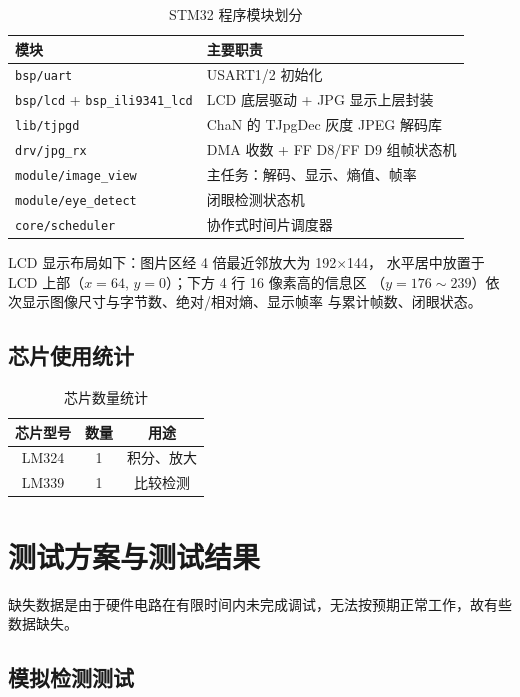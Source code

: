 \documentclass[a4paper]{article}
\begin{document}
\begin{table}[H]
\centering
\caption{STM32 程序模块划分}
\label{tab:mcu_modules}
\begin{tabular}{ll}
\toprule
模块 & 主要职责 \\
\midrule
\texttt{bsp/uart}                    & USART1/2 初始化 \\
\texttt{bsp/lcd} + \texttt{bsp\_ili9341\_lcd} & LCD 底层驱动 + JPG 显示上层封装 \\
\texttt{lib/tjpgd}                   & ChaN 的 TJpgDec 灰度 JPEG 解码库 \\
\texttt{drv/jpg\_rx}                 & DMA 收数 + FF D8/FF D9 组帧状态机 \\
\texttt{module/image\_view}          & 主任务：解码、显示、熵值、帧率 \\
\texttt{module/eye\_detect}          & 闭眼检测状态机 \\
\texttt{core/scheduler}              & 协作式时间片调度器 \\
\bottomrule
\end{tabular}
\end{table}

LCD 显示布局如下：图片区经 4 倍最近邻放大为 192$\times$144，
水平居中放置于 LCD 上部（$x=64$, $y=0$）；下方 4 行 16 像素高的信息区
（$y=176 \sim 239$）依次显示图像尺寸与字节数、绝对/相对熵、显示帧率
与累计帧数、闭眼状态。


\subsection{芯片使用统计}

\begin{table}[H]
\centering
\caption{芯片数量统计}
\begin{tabular}{ccc}
\toprule
芯片型号&数量&用途\\
\midrule
LM324& 1&积分、放大\\
LM339& 1&比较检测\\
\bottomrule
\end{tabular}
\end{table}


\newpage
\section{测试方案与测试结果}

缺失数据是由于硬件电路在有限时间内未完成调试，无法按预期正常工作，故有些数据缺失。

\subsection{模拟检测测试}
\end{document}
